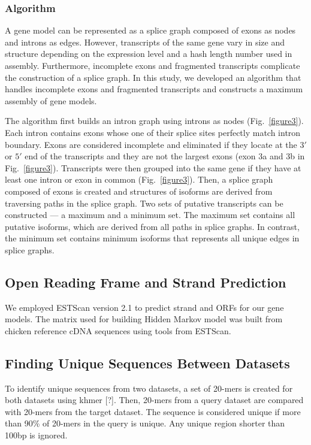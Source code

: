 \documentclass[10pt]{article}
\begin{document}
\subsubsection*{Algorithm}

A gene model can be represented as a splice graph composed of exons as nodes and introns as edges.
However, transcripts of the same gene vary in size and structure depending on the expression level and a hash length number used in assembly.
Furthermore, incomplete exons and fragmented transcripts complicate the construction of a splice graph.
In this study, we developed an algorithm that handles incomplete exons and fragmented transcripts and constructs a maximum assembly of gene models.

The algorithm first builds an intron graph using introns as nodes  (Fig.~\ref{figure3}).
Each intron contains exons whose one of their splice sites perfectly match intron boundary.
Exons are considered incomplete and eliminated if they locate at the $3'$ or $5'$ end of the transcripts and they are not the largest exons (exon 3a and 3b in Fig.~\ref{figure3}).
Transcripts were then grouped into the same gene if they have at least one intron or exon in common (Fig.~\ref{figure3}).
Then, a splice graph composed of exons is created and structures of isoforms are derived from traversing paths in the splice graph.
Two sets of putative transcripts can be constructed --- a maximum and a minimum set.
The maximum set contains all putative isoforms, which are derived from all paths in splice graphs.
In contrast, the minimum set contains minimum isoforms that represents all unique edges in splice graphs.

\subsection*{Open Reading Frame and Strand Prediction}

We employed ESTScan version 2.1\cite{Iseli:1999vd} to predict strand and ORFs for our gene models.
The matrix used for building Hidden Markov model was built from chicken reference cDNA sequences using tools from ESTScan.

\subsection*{Finding Unique Sequences Between Datasets}

To identify unique sequences from two datasets, a set of 20-mers is created for both datasets using khmer [?].
Then, 20-mers from a query dataset are compared with 20-mers from the target dataset.
The sequence is considered unique if more than 90\% of 20-mers in the query is unique.
Any unique region shorter than 100bp is ignored.
\end{document}
